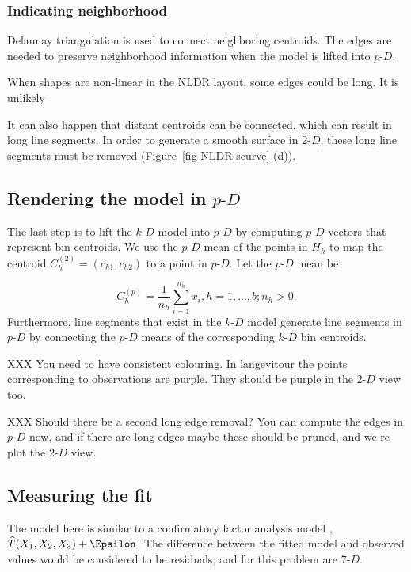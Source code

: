 \documentclass[
  12pt]{article}
\newcommand\pD{$p\text{-}D$}
\newcommand\kD{$k\text{-}D$}
\newcommand\gD{$2\text{-}D$}
\begin{document}
\subsubsection{Indicating neighborhood}\label{indicating-neighborhood}

Delaunay triangulation \citep{lee1980, alb2024} is used to connect
neighboring centroids. The edges are needed to preserve neighborhood
information when the model is lifted into \pD{}.

When shapes are non-linear in the NLDR layout, some edges could be long.
It is unlikely

It can also happen that distant centroids can be connected, which can
result in long line segments. In order to generate a smooth surface in
\gD{}, these long line segments must be removed
(Figure~\ref{fig-NLDR-scurve} (d)).

\subsection{\texorpdfstring{Rendering the model in
\pD{}}{Rendering the model in }}\label{rendering-the-model-in}

The last step is to lift the \kD{} model into \pD{} by computing \pD{}
vectors that represent bin centroids. We use the \pD{} mean of the
points in \(H_h\) to map the centroid \(C_{h}^{(2)} = (c_{h1}, c_{h2})\)
to a point in \pD{}. Let the \pD{} mean be

\[C_{h}^{(p)} = \frac{1}{n_h}\sum_{i =1}^{n_h} x_i, h = {1, \dots, b; n_h > 0}.\]
Furthermore, line segments that exist in the \kD{} model generate line
segments in \pD{} by connecting the \pD{} means of the corresponding
\kD{} bin centroids.

XXX You need to have consistent colouring. In langevitour the points
corresponding to observations are purple. They should be purple in the
\gD{} view too.

XXX Should there be a second long edge removal? You can compute the
edges in \pD{} now, and if there are long edges maybe these should be
pruned, and we re-plot the \gD{} view.

\subsection{Measuring the fit}\label{sec-summary}

The model here is similar to a confirmatory factor analysis model
\citep{brown2015}, \(\widehat{T}(X_1, X_2, X_3) + \Epsilon\). The
difference between the fitted model and observed values would be
considered to be residuals, and for this problem are \(7\text{-}D\).
\end{document}
